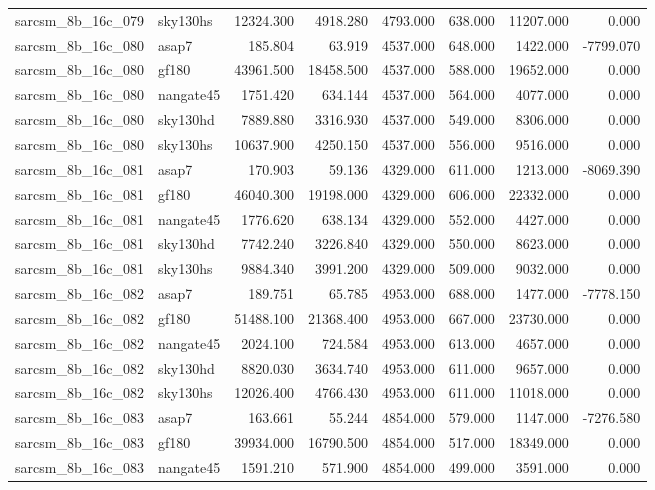 \begin{tabular}{llrrrrrr}
sarcsm\_8b\_16c\_079 & sky130hs & 12324.300 & 4918.280 & 4793.000 & 638.000 & 11207.000 & 0.000 \\
sarcsm\_8b\_16c\_080 & asap7 & 185.804 & 63.919 & 4537.000 & 648.000 & 1422.000 & -7799.070 \\
sarcsm\_8b\_16c\_080 & gf180 & 43961.500 & 18458.500 & 4537.000 & 588.000 & 19652.000 & 0.000 \\
sarcsm\_8b\_16c\_080 & nangate45 & 1751.420 & 634.144 & 4537.000 & 564.000 & 4077.000 & 0.000 \\
sarcsm\_8b\_16c\_080 & sky130hd & 7889.880 & 3316.930 & 4537.000 & 549.000 & 8306.000 & 0.000 \\
sarcsm\_8b\_16c\_080 & sky130hs & 10637.900 & 4250.150 & 4537.000 & 556.000 & 9516.000 & 0.000 \\
sarcsm\_8b\_16c\_081 & asap7 & 170.903 & 59.136 & 4329.000 & 611.000 & 1213.000 & -8069.390 \\
sarcsm\_8b\_16c\_081 & gf180 & 46040.300 & 19198.000 & 4329.000 & 606.000 & 22332.000 & 0.000 \\
sarcsm\_8b\_16c\_081 & nangate45 & 1776.620 & 638.134 & 4329.000 & 552.000 & 4427.000 & 0.000 \\
sarcsm\_8b\_16c\_081 & sky130hd & 7742.240 & 3226.840 & 4329.000 & 550.000 & 8623.000 & 0.000 \\
sarcsm\_8b\_16c\_081 & sky130hs & 9884.340 & 3991.200 & 4329.000 & 509.000 & 9032.000 & 0.000 \\
sarcsm\_8b\_16c\_082 & asap7 & 189.751 & 65.785 & 4953.000 & 688.000 & 1477.000 & -7778.150 \\
sarcsm\_8b\_16c\_082 & gf180 & 51488.100 & 21368.400 & 4953.000 & 667.000 & 23730.000 & 0.000 \\
sarcsm\_8b\_16c\_082 & nangate45 & 2024.100 & 724.584 & 4953.000 & 613.000 & 4657.000 & 0.000 \\
sarcsm\_8b\_16c\_082 & sky130hd & 8820.030 & 3634.740 & 4953.000 & 611.000 & 9657.000 & 0.000 \\
sarcsm\_8b\_16c\_082 & sky130hs & 12026.400 & 4766.430 & 4953.000 & 611.000 & 11018.000 & 0.000 \\
sarcsm\_8b\_16c\_083 & asap7 & 163.661 & 55.244 & 4854.000 & 579.000 & 1147.000 & -7276.580 \\
sarcsm\_8b\_16c\_083 & gf180 & 39934.000 & 16790.500 & 4854.000 & 517.000 & 18349.000 & 0.000 \\
sarcsm\_8b\_16c\_083 & nangate45 & 1591.210 & 571.900 & 4854.000 & 499.000 & 3591.000 & 0.000 \\

\end{tabular}
